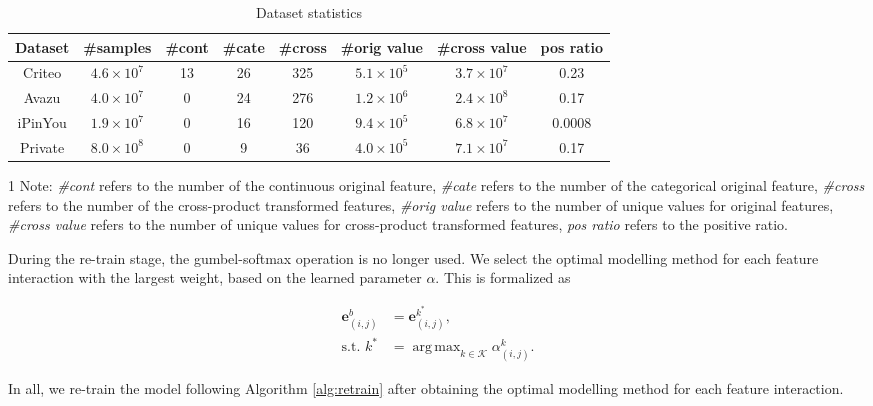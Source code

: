 \documentclass[conference]{IEEEtran}
\DeclareMathOperator*{\argmax}{arg\,max}
\begin{document}
\begin{table*}[!htbp]
    \renewcommand\arraystretch{1.00}
    \centering
    \caption{Dataset statistics}
    \begin{tabular}{c|ccccccc}
        \hline
        Dataset & \#samples & \#cont & \#cate & \#cross & \#orig value & \#cross value & pos ratio \\
        \hline
        Criteo  & $4.6 \times 10^7$ & 13 & 26 & 325 & $5.1 \times 10^5$ & $3.7 \times 10^7$ & 0.23 \\
        Avazu   & $4.0 \times 10^7$ & 0  & 24 & 276 & $1.2 \times 10^6$ & $2.4 \times 10^8$ & 0.17 \\
        iPinYou & $1.9 \times 10^7$ & 0  & 16 & 120 & $9.4 \times 10^5$ & $6.8 \times 10^7$ & 0.0008 \\
        Private & $8.0 \times 10^8$ & 0  & 9  & 36  & $4.0 \times 10^5$ & $7.1 \times 10^7$ & 0.17 \\
        \hline
    \end{tabular}
    \begin{tablenotes}
    \footnotesize
    \item[1] Note: \textit{\#cont} refers to the number of the continuous original feature, \textit{\#cate} refers to the number of the categorical original feature, \textit{\#cross} refers to the number of the cross-product transformed features, \textit{\#orig value} refers to the number of unique values for original features, \textit{\#cross value} refers to the number of unique values for cross-product transformed features, \textit{pos ratio} refers to the positive ratio. 
    \end{tablenotes}
    \label{Table:dataset}
\end{table*}

During the re-train stage, the gumbel-softmax operation is no longer used. We select the optimal modelling method for each feature interaction with the largest weight, based on the learned parameter $\alpha$. This is formalized as

\begin{equation}
\begin{split}
    \mathbf{e}^{b}_{(i,j)} &= \mathbf{e}_{(i,j)}^{k^{*}}, \\
    \text{s.t. $k^{*}$} &= \argmax_{k \in \mathcal{K}} \alpha_{(i,j)}^k.
\end{split}
\end{equation}

In all, we re-train the model following Algorithm \ref{alg:retrain} after obtaining the optimal modelling method for each feature interaction. 
\end{document}
